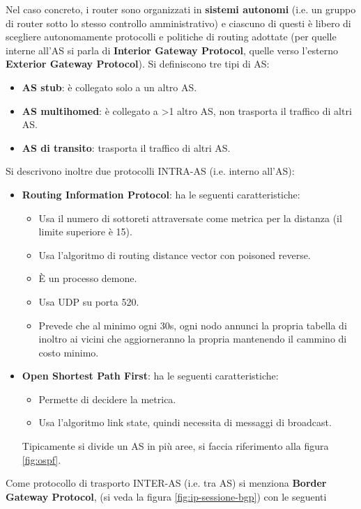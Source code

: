 \documentclass[11pt, italian, openany]{book}
\begin{document}
\begin{sloppypar}
Nel caso concreto, i router sono organizzati in \textbf{sistemi autonomi} (i.e. un gruppo di router sotto lo stesso controllo amministrativo) e ciascuno
di questi \`e libero di scegliere autonomamente protocolli e politiche di routing adottate (per quelle interne all'AS si parla di \textbf{Interior
Gateway Protocol}, quelle verso l'esterno \textbf{Exterior Gateway Protocol}). Si definiscono tre tipi di AS:
\begin{itemize}[itemsep=0pt, parsep=0pt, topsep=0pt]
	\item \textbf{AS stub}: \`e collegato solo a un altro AS.
	\item \textbf{AS multihomed}: \`e collegato a >1 altro AS, non trasporta il traffico di altri AS.
	\item \textbf{AS di transito}: trasporta il traffico di altri AS.
\end{itemize}
{}
Si descrivono inoltre due protocolli INTRA-AS (i.e. interno all'AS):
\begin{itemize}[topsep=0pt, parsep=0pt, itemsep=0pt]
	\item \textbf{Routing Information Protocol}: ha le seguenti caratteristiche:
	\begin{itemize}
		\item Usa il numero di sottoreti attraversate come metrica per la distanza (il limite superiore \`e 15).
		\item Usa l'algoritmo di routing distance vector con poisoned reverse.
		\item \`E un processo demone.
		\item Usa UDP su porta 520.
		\item Prevede che al minimo ogni 30s, ogni nodo annunci la propria tabella di inoltro ai vicini che aggiorneranno la propria mantenendo il cammino
		di costo minimo.
	\end{itemize}
	\item \textbf{Open Shortest Path First}: ha le seguenti caratteristiche:
	\begin{itemize}
		\item Permette di decidere la metrica.
		\item Usa l'algoritmo link state, quindi necessita di messaggi di broadcast.
	\end{itemize}
	Tipicamente si divide un AS in pi\`u aree, si faccia riferimento alla figura \ref{fig:ospf}.
\end{itemize}
Come protocollo di trasporto INTER-AS (i.e. tra AS) si menziona \textbf{Border Gateway Protocol}, (si veda la figura \ref{fig:ip-sessione-bgp}) con le seguenti

\end{sloppypar}
\end{document}
